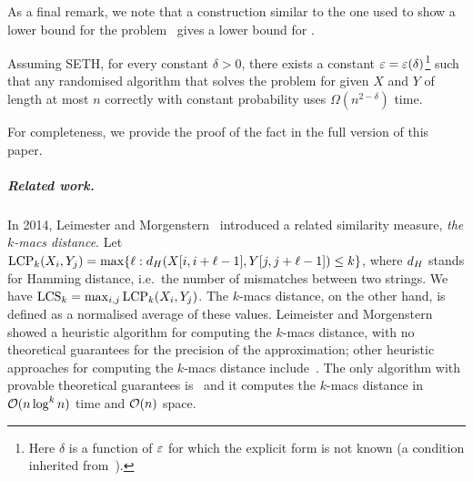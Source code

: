 As a final remark, we note that a construction similar to the one used to show a lower bound for the \kLCS problem~\cite{DBLP:journals/algorithmica/KociumakaRS19} gives a lower bound for \kApproxLCS. 

\begin{fact}\label{lm:klcs_lower}
Assuming SETH, for every constant $\delta > 0$, there exists a constant $\varepsilon = \varepsilon(\delta)$\footnote{Here $\delta$ is a function of $\varepsilon$ for which the explicit form is not known (a condition inherited from~\cite{DBLP:journals/corr/abs-1803-00904}).} such that any randomised algorithm that solves the \kApproxLCS problem for given $X$ and $Y$ of length at most $n$ correctly with constant probability uses $\Omega(n^{2-\delta})$ time. 
\end{fact}

For completeness, we provide the proof of the fact in the full version of this paper.

\subparagraph*{Related work.}
In 2014, Leimester and Morgenstern~\cite{leimeister2014kmacs} introduced a related similarity measure, \emph{the $k$-macs distance}. Let $\mathrm{LCP}_{k} (X_i, Y_j) = \max\{\ell: d_H(X[i,i+\ell-1], Y[j, j+\ell-1]) \le k\}$, where $d_H$ stands for Hamming distance, i.e.\ the number of mismatches between two strings. We have $\mathrm{LCS}_{k} = \max_{i,j} \mathrm{LCP}_{k}(X_i, Y_j)$. The $k$-macs distance, on the other hand, is defined as a normalised average of these values.  Leimeister and Morgenstern~\cite{leimeister2014kmacs} showed a heuristic algorithm for computing the $k$-macs distance, with no theoretical guarantees for the precision of the approximation; other heuristic approaches for computing the $k$-macs distance include~\cite{DBLP:journals/jcb/ThankachanCLAA16,Thankachan2017}. The only algorithm with provable theoretical guarantees is~\cite{DBLP:journals/jcb/ThankachanAA16} and it computes the $k$-macs distance in $\mathcal{O}(n \log^k n)$ time and $\mathcal{O}(n)$ space.

